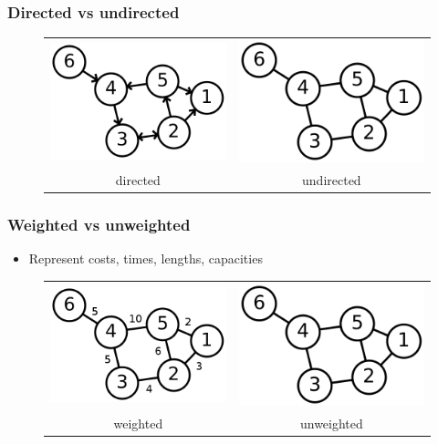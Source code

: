 \documentclass[12pt]{beamer}
\begin{document}
\begin{frame}
\frametitle{Directed vs undirected}
\begin{figure}
\centering
\begin{tabular}{cc}
\includegraphics[width=0.4\linewidth]{img/6n-directed}
& \includegraphics[width=0.4\linewidth]{img/6n-graph} \\
directed & undirected
\end{tabular}
\end{figure}
\end{frame}

\begin{frame}
\frametitle{Weighted vs unweighted}
\begin{itemize}
\item Represent costs, times, lengths, capacities
\end{itemize}
\begin{figure}
\centering
\begin{tabular}{cc}
\includegraphics[width=0.4\linewidth]{img/6n-weighted}
& \includegraphics[width=0.4\linewidth]{img/6n-graph} \\
weighted & unweighted
\end{tabular}
\end{figure}
\end{frame}
\end{document}
